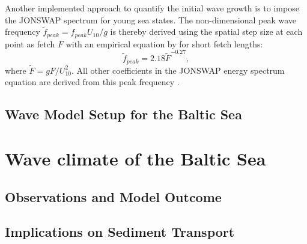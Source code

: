Another implemented approach to quantify the initial wave growth is to impose the JONSWAP spectrum for young sea states. The non-dimensional peak wave frequency $\tilde{f}_{peak} = f_{peak} U_{10} / g$ is thereby derived using the spatial step size at each point as fetch $F$ with an empirical equation by \cite{kahma1992} for short fetch lengths:
\begin{equation}
 \tilde{f}_{peak} = 2.18 \tilde{F}^{-0.27},
\end{equation}
where $\tilde{F} = g F / U_{10}^2$. All other coefficients in the JONSWAP energy spectrum equation are derived from this peak frequency \citep[][]{holthuijsen2007}.



\subsection{Wave Model Setup for the Baltic Sea}

\section{Wave climate of the Baltic Sea}

\subsection{Observations and Model Outcome}

\subsection{Implications on Sediment Transport}